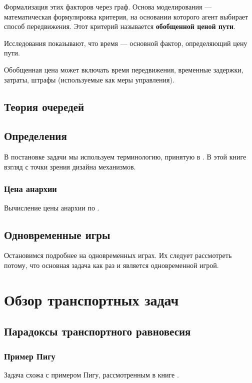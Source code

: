 Формализация этих факторов через граф.
Основа моделирования — математическая формулировка критерия, на основании которого агент выбирает способ передвижения. Этот критерий называется \textbf{обобщенной ценой пути}.

Исследования показывают, что время --- основной фактор, определяющий цену пути.\cite[4]{matmod_shvetsov}

Обобщенная цена может включать время передвижения, временные задержки, затраты, штрафы (используемые как меры управления).


\section{Теория очередей}

\section{Определения}
В постановке задачи мы используем терминологию, принятую в \cite[с. 461, Tim Roughgarden, Routing games]{nisan}.
В этой книге взгляд с точки зрения дизайна механизмов.


\subsection{Цена анархии}

Вычисление цены анархии по \cite[69]{rough1}.


\section{Одновременные игры}

Остановимся подробнее на одновременных играх. Их следует рассмотреть потому, что основная задача как раз и является одновременной игрой.






\chapter{Обзор транспортных задач}
\section{Парадоксы транспортного равновесия}
\subsection{Пример Пигу}\cite[447]{nisan}
Задача схожа с примером Пигу, рассмотренным в книге \cite{nisan}.

